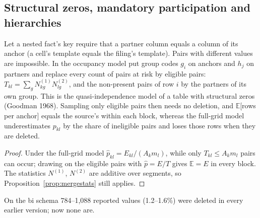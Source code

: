\subsection{Structural zeros, mandatory participation and hierarchies}
\begin{proposition}\label{prop:structzero}
Let a nested fact's key require that a partner column equals a column of its anchor (a cell's template equals the filing's template). Pairs with different values are impossible. In the occupancy model put group codes $g_i$ on anchors and $h_j$ on partners and replace every count of pairs at risk by eligible pairs: $T_{kl}=\sum_g N^{(1)}_{kg}N^{(2)}_{lg}$, and the non-present pairs of row $i$ by the partners of its own group. This is the quasi-independence model of a table with structural zeros (Goodman 1968). Sampling only eligible pairs then needs no deletion, and $\mathbb E$[rows per anchor] equals the source's within each block, whereas the full-grid model underestimates $p_{kl}$ by the share of ineligible pairs and loses those rows when they are deleted.
\end{proposition}
\begin{proof}
Under the full-grid model $\hat p_{kl}=E_{kl}/(A_km_l)$, while only $T_{kl}\le A_km_l$ pairs can occur; drawing on the eligible pairs with $\hat p=E/T$ gives $\mathbb E=E$ in every block. The statistics $N^{(1)}$, $N^{(2)}$ are additive over segments, so Proposition~\ref{prop:mergestats} still applies.
\end{proof}
\noindent On the bi schema 784--1{,}088 reported values (1.2--1.6\%) were deleted in every earlier version; now none are.

